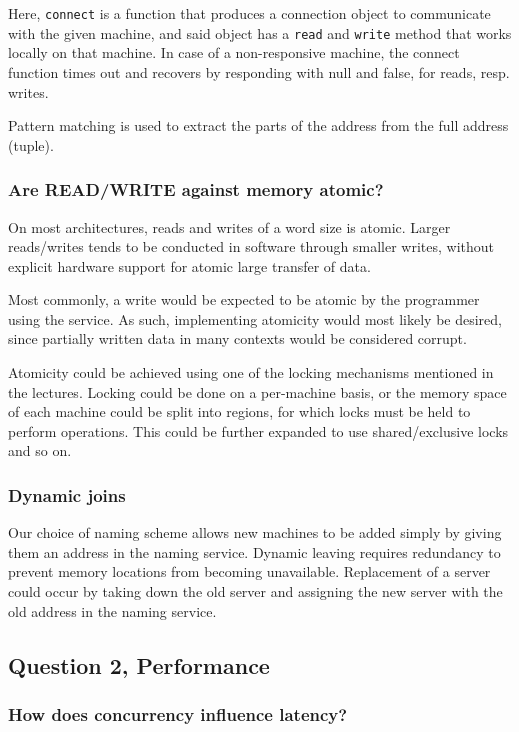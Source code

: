 \documentclass[11pt,a4paper]{article}
\begin{document}
Here, \texttt{connect} is a function that produces a connection object to
communicate with the given machine, and said object has a \texttt{read} and
\texttt{write} method that works locally on that machine. In case of a non-responsive
machine, the connect function times out and recovers by responding with null and false,
for reads, resp. writes.

Pattern matching is used to extract the parts of the address from the full
address (tuple).

\subsubsection{Are READ/WRITE against memory atomic?}
On most architectures, reads and writes of a word size is atomic. Larger 
reads/writes tends to be conducted in software through smaller writes,
without explicit hardware support for atomic large transfer of data.

Most commonly, a write would be expected to be atomic by the programmer using
the service. As such, implementing atomicity would most likely be desired, since
partially written data in many contexts would be considered corrupt.

Atomicity could be achieved using one of the locking mechanisms mentioned
in the lectures. Locking could be done on a per-machine basis, or the
memory space of each machine could be split into regions, for which locks
must be held to perform operations. This could be further expanded to use
shared/exclusive locks and so on.

\subsubsection{Dynamic joins}
Our choice of naming scheme allows new machines to be added simply by giving
them an address in the naming service. Dynamic leaving requires redundancy to
prevent memory locations from becoming unavailable. Replacement of a server
could occur by taking down the old server and assigning the new server with the
old address in the naming service.

\subsection{Question 2, Performance}
\subsubsection{How does concurrency influence latency?}
\end{document}
